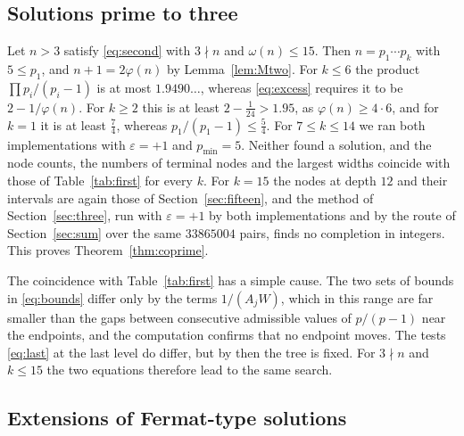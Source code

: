 \documentclass[11pt,reqno]{amsart}
\numberwithin{equation}{section}
\theoremstyle{plain}
\theoremstyle{definition}
\theoremstyle{remark}
\begin{document}
\subsection{Solutions prime to three}
Let $n>3$ satisfy \eqref{eq:second} with $3\nmid n$ and
$\omega(n)\le15$. Then $n=p_1\cdots p_k$ with $5\le p_1$, and
$n+1=2\varphi(n)$ by Lemma~\ref{lem:Mtwo}. For $k\le6$ the product
$\prod p_i/(p_i-1)$ is at most $1.9490\ldots$, whereas
\eqref{eq:excess} requires it to be $2-1/\varphi(n)$. For $k\ge2$
this is at least $2-\frac1{24}>1.95$, as $\varphi(n)\ge4\cdot6$, and
for $k=1$ it is at least $\frac74$, whereas $p_1/(p_1-1)\le\frac54$. For
$7\le k\le14$ we ran both implementations with $\varepsilon=+1$ and
$p_{\min}=5$. Neither found a solution, and the node counts, the
numbers of terminal nodes and the largest widths coincide with those
of Table~\ref{tab:first} for every $k$. For $k=15$ the nodes at depth
$12$ and their intervals are again those of
Section~\ref{sec:fifteen}, and the method of Section~\ref{sec:three},
run with $\varepsilon=+1$ by both implementations and by the route of
Section~\ref{sec:sum} over the same $33865004$ pairs, finds no
completion in integers. This proves
Theorem~\ref{thm:coprime}.

The coincidence with Table~\ref{tab:first} has a simple cause. The
two sets of bounds in \eqref{eq:bounds} differ only by the terms
$1/(A_jW)$, which in this range are far smaller than the gaps between
consecutive admissible values of $p/(p-1)$ near the endpoints, and the
computation confirms that no endpoint moves. The tests
\eqref{eq:last} at the last level do differ, but by then the tree is
fixed. For $3\nmid n$ and $k\le15$ the two equations therefore lead to the
same search.

\subsection{Extensions of Fermat-type solutions}
\end{document}

